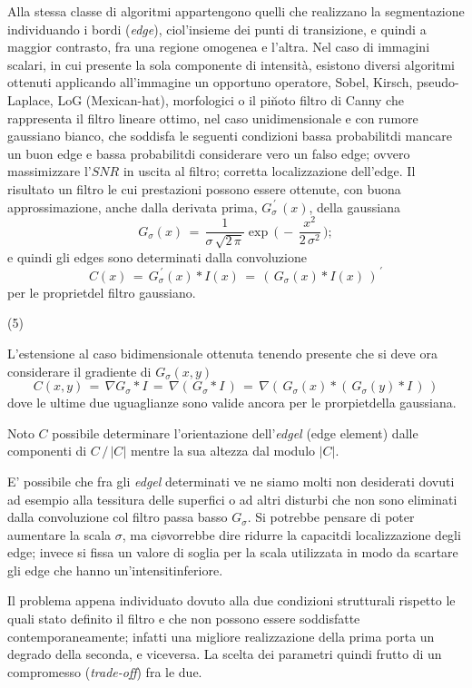 Alla stessa classe di algoritmi appartengono quelli che realizzano la segmentazione
individuando i bordi ({\it edge}), cio\e l'insieme dei punti di transizione,
e quindi a maggior contrasto, fra una regione omogenea e l'altra.
Nel caso di immagini scalari, in cui \e presente la sola componente di intensit\`a, esistono 
diversi algoritmi ottenuti applicando all'immagine un opportuno operatore, Sobel, Kirsch,
pseudo-Laplace, LoG (Mexican-hat), morfologici \cite{Zamperoni} o il pi\u noto filtro di
Canny \cite{Canny} che rappresenta il filtro lineare ottimo, nel caso unidimensionale e con 
rumore gaussiano bianco, che soddisfa le seguenti condizioni
\ben
\im bassa probabilit\a di mancare un buon edge e bassa probabilit\a di considerare
    vero un falso edge; ovvero massimizzare l'$SNR$ in uscita al filtro;
\im corretta localizzazione dell'edge.
\een 
Il risultato \e un filtro le cui prestazioni possono essere ottenute, con buona
approssimazione, anche dalla derivata prima, $G_{\sigma}^{\,\prime}\,(x)$, della gaussiana
$$
G_\sigma(x)\,=\,\frac{1}{\sigma\,\sqrt{2\,\pi}}\exp\,\Big(\,-\,\frac{x^2}{2\,\sigma^2}\,\Big);
$$
e quindi gli edges sono determinati dalla convoluzione 
$$
C(x)\,=\,G_{\sigma}^{\,\prime}(x) \ast I(x)\,=\,(\,G_{\sigma} (x) \ast I(x)\,)^{\,\prime}
$$
per le propriet\a del filtro gaussiano.

\vs(5)

L'estensione al caso bidimensionale \e ottenuta tenendo presente che si deve ora considerare
il gradiente di $G_\sigma (x,y)$
$$
C(x,y)\,=\,\nabla G_\sigma \ast I\,=\,\nabla (\,G_\sigma \ast I\,)\,=\,
 \nabla (\,G_\sigma (x) \ast (\,G_\sigma (y) \ast I\,)\,)
$$
dove le ultime due uguaglianze sono valide ancora per le prorpiet\a della gaussiana.

Noto $C$ \e possibile determinare l'orientazione dell'{\it edgel} (edge element)
dalle componenti di $C\,/\,|C|$ mentre la sua altezza dal modulo $|C|$.

E' possibile che fra gli {\it edgel} determinati ve ne siamo molti non desiderati dovuti
ad esempio alla tessitura delle superfici o ad altri disturbi che non sono eliminati
dalla convoluzione col filtro passa basso $G_\sigma$.
Si potrebbe pensare di poter aumentare la scala $\sigma$, ma ci\o vorrebbe dire
ridurre la capacit\a di localizzazione degli edge; invece si fissa un valore di soglia
per la scala utilizzata in modo da scartare gli edge che hanno un'intensit\a inferiore.

Il problema appena individuato \e dovuto alla due condizioni strutturali rispetto le quali
\e stato definito il filtro e che non possono essere soddisfatte contemporaneamente; 
infatti una migliore realizzazione della prima porta un degrado della seconda, e viceversa.
La scelta dei parametri \e quindi frutto di un compromesso ({\it trade-off}) fra le due.

